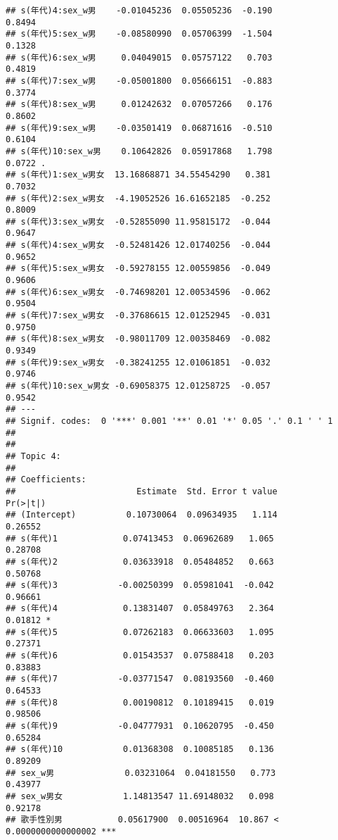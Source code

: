 \documentclass[
]{article}
\begin{document}
\begin{verbatim}
## s(年代)4:sex_w男    -0.01045236  0.05505236  -0.190              0.8494    
## s(年代)5:sex_w男    -0.08580990  0.05706399  -1.504              0.1328    
## s(年代)6:sex_w男     0.04049015  0.05757122   0.703              0.4819    
## s(年代)7:sex_w男    -0.05001800  0.05666151  -0.883              0.3774    
## s(年代)8:sex_w男     0.01242632  0.07057266   0.176              0.8602    
## s(年代)9:sex_w男    -0.03501419  0.06871616  -0.510              0.6104    
## s(年代)10:sex_w男    0.10642826  0.05917868   1.798              0.0722 .  
## s(年代)1:sex_w男女  13.16868871 34.55454290   0.381              0.7032    
## s(年代)2:sex_w男女  -4.19052526 16.61652185  -0.252              0.8009    
## s(年代)3:sex_w男女  -0.52855090 11.95815172  -0.044              0.9647    
## s(年代)4:sex_w男女  -0.52481426 12.01740256  -0.044              0.9652    
## s(年代)5:sex_w男女  -0.59278155 12.00559856  -0.049              0.9606    
## s(年代)6:sex_w男女  -0.74698201 12.00534596  -0.062              0.9504    
## s(年代)7:sex_w男女  -0.37686615 12.01252945  -0.031              0.9750    
## s(年代)8:sex_w男女  -0.98011709 12.00358469  -0.082              0.9349    
## s(年代)9:sex_w男女  -0.38241255 12.01061851  -0.032              0.9746    
## s(年代)10:sex_w男女 -0.69058375 12.01258725  -0.057              0.9542    
## ---
## Signif. codes:  0 '***' 0.001 '**' 0.01 '*' 0.05 '.' 0.1 ' ' 1
## 
## 
## Topic 4:
## 
## Coefficients:
##                        Estimate  Std. Error t value             Pr(>|t|)    
## (Intercept)          0.10730064  0.09634935   1.114              0.26552    
## s(年代)1             0.07413453  0.06962689   1.065              0.28708    
## s(年代)2             0.03633918  0.05484852   0.663              0.50768    
## s(年代)3            -0.00250399  0.05981041  -0.042              0.96661    
## s(年代)4             0.13831407  0.05849763   2.364              0.01812 *  
## s(年代)5             0.07262183  0.06633603   1.095              0.27371    
## s(年代)6             0.01543537  0.07588418   0.203              0.83883    
## s(年代)7            -0.03771547  0.08193560  -0.460              0.64533    
## s(年代)8             0.00190812  0.10189415   0.019              0.98506    
## s(年代)9            -0.04777931  0.10620795  -0.450              0.65284    
## s(年代)10            0.01368308  0.10085185   0.136              0.89209    
## sex_w男              0.03231064  0.04181550   0.773              0.43977    
## sex_w男女            1.14813547 11.69148032   0.098              0.92178    
## 歌手性別男           0.05617900  0.00516964  10.867 < 0.0000000000000002 ***

\end{verbatim}
\end{document}
